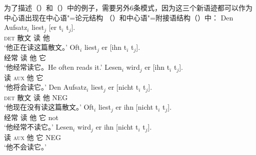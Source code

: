 为了描述（）和（）中的例子，需要另外6条模式，因为这三个新语迹都可以作为中心语出现在中心语"=论元结构 （）和中心语"=附接语结构（）中：
\eal
\ex 
\gll Den Aufsatz$_i$ liest$_j$ [er t$_i$ t$_j$].\\
	\textsc{det} 散文 读 \spacebr{}他\\
\glt `他正在读这篇散文。'
\ex 
\gll Oft$_i$ liest$_j$ er [ihn t$_i$ t$_j$].\\
	 经常 读 他 \spacebr{}它\\
\glt `他经常读它。He often reads it.'
\ex 
\gll Lesen$_i$ wird$_j$ er [ihn t$_i$ t$_j$].\\
	读 \textsc{aux} 他 \spacebr{}它\\
\glt `他将会读它。'
\zl
\eal
\ex 
\gll Den Aufsatz$_i$ liest$_j$ er [nicht t$_i$ t$_j$].\\
	\textsc{det} 散文 读 他 \spacebr{}NEG\\
\glt `他现在没有读这篇散文。'
\ex 
\gll Oft$_i$ liest$_j$ er ihn [nicht t$_i$ t$_j$].\\
	 经常 读 他 它 \spacebr{}not\\
\glt `他经常不读它。'
\ex 
\gll Lesen$_i$ wird$_j$ er ihn [nicht t$_i$ t$_j$].\\
	 读 \textsc{aux} 他 它 \spacebr{}NEG\\
\glt `他不会读它。'
